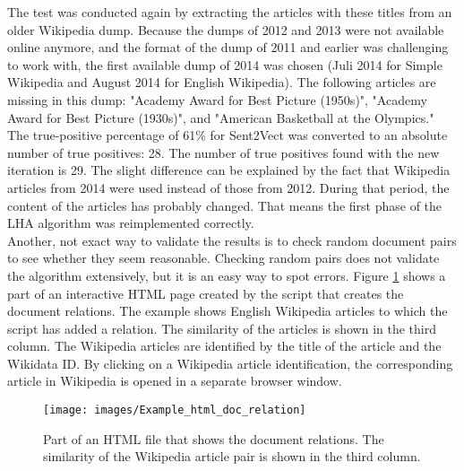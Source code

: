 The test was conducted again by extracting the articles with these titles from an older Wikipedia dump. Because the dumps of 2012 and 2013 were not available online anymore, and the format of the dump of 2011 and earlier was challenging to work with, the first available dump of 2014 was chosen (Juli 2014 for  Simple Wikipedia and August 2014 for English Wikipedia). The following articles are missing in this dump: "Academy Award for Best Picture (1950s)", "Academy Award for Best Picture (1930s)", and "American Basketball at the Olympics."\\

The true-positive percentage of 61\% for Sent2Vect was converted to an absolute number of true positives: 28. The number of true positives found with the new iteration is 29. The slight difference can be explained by the fact that Wikipedia articles from 2014 were used instead of those from 2012. During that period, the content of the articles has probably changed. That means the first phase of the LHA algorithm was reimplemented correctly.\\

Another, not exact way to validate the results is to check random document pairs to see whether they seem reasonable. Checking random pairs does not validate the algorithm extensively, but it is an easy way to spot errors. Figure \ref{imgRelationsHtml} shows a part of an interactive HTML page created by the script that creates the document relations. The example shows English Wikipedia articles to which the script has added a relation. The similarity of the articles is shown in the third column. The Wikipedia articles are identified by the title of the article and the Wikidata ID. By clicking on a Wikipedia article identification, the corresponding article in Wikipedia is opened in a separate browser window. 

 

 

\begin{figure}[h]
\centering
\captionsetup{justification=centering}
\texttt{[image: images/Example\_html\_doc\_relation]}
\caption{Part of an HTML file that shows the document relations. The similarity of the Wikipedia article pair is shown in the third column.}
\label{imgRelationsHtml}
\end{figure}


